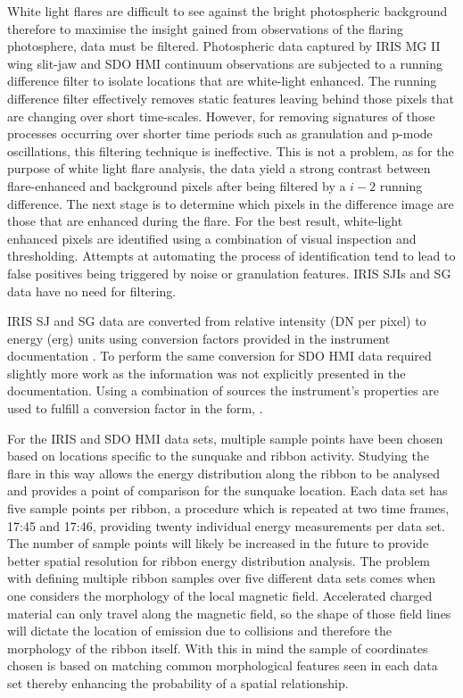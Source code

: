 White light flares are difficult to see against the bright photospheric background therefore to maximise the insight gained from observations of the flaring photosphere, data must be filtered. Photospheric data captured by IRIS MG II wing slit-jaw and SDO HMI continuum observations are subjected to a running difference filter to isolate locations that are white-light enhanced. The running difference filter effectively removes static features leaving behind those pixels that are changing over short time-scales. However, for removing signatures of those processes occurring over shorter time periods such as granulation and p-mode oscillations, this filtering technique is ineffective. This is not a problem, as for the purpose of white light flare analysis, the data yield a strong contrast between flare-enhanced and background pixels after being filtered by a $i-2$ running difference. The next stage is to determine which pixels in the difference image are those that are enhanced during the flare. For the best result, white-light enhanced pixels are identified using a combination of visual inspection and thresholding. Attempts at automating the process of identification tend to lead to false positives being triggered by noise or granulation features. IRIS SJIs and SG data have no need for filtering.


IRIS SJ and SG data are converted from relative intensity (DN per pixel) to energy (erg) units using conversion factors provided in the instrument documentation \citep{}. To perform the same conversion for SDO HMI data required slightly more work as the information was not explicitly presented in the documentation. Using a combination of sources \citep{} the instrument's properties are used to fulfill a conversion factor in the form, $ $.

For the IRIS and SDO HMI data sets, multiple sample points have been chosen based on locations specific to the sunquake and ribbon activity. Studying the flare in this way allows the energy distribution along the ribbon to be analysed and provides a point of comparison for the sunquake location. Each data set has five sample points per ribbon, a procedure which is repeated at two time frames, 17:45 and 17:46, providing twenty individual energy measurements per data set. The number of sample points will likely be increased in the future to provide better spatial resolution for ribbon energy distribution analysis. The problem with defining multiple ribbon samples over five different data sets comes when one considers the morphology of the local magnetic field. Accelerated charged material can only travel along the magnetic field, so the shape of those field lines will dictate the location of emission due to collisions and therefore the morphology of the ribbon itself. With this in mind the sample of coordinates chosen is based on matching common morphological features seen in each data set thereby enhancing the probability of a spatial relationship.


